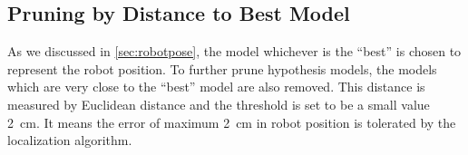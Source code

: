 \subsection{Pruning by Distance to Best Model}
\label{sub:Pruning by Distance to Best Model}

As we discussed in \autoref{sec:robotpose}, the model whichever is the ``best'' is chosen to represent the robot position. To further prune hypothesis models, the models which are very close to the ``best'' model are also removed. This distance is measured by Euclidean distance and the threshold is set to be a small value \SI{2}{\cm}. It means the error of maximum \SI{2}{\cm} in robot position is tolerated by the localization algorithm.

